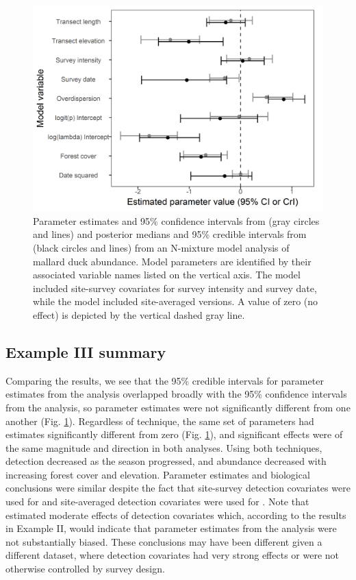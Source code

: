 \documentclass[codesnippet]{jss}
\begin{document}
\begin{figure}[p]
  \includegraphics[width=5in]{jss3107fig3.png}
  \caption{Parameter estimates and 95\% confidence intervals from  (gray circles and lines) and posterior medians and 95\% credible intervals from  (black circles and lines) from an N-mixture model analysis of mallard duck abundance. Model parameters are identified by their associated variable names listed on the vertical axis.  The  model included site-survey covariates for survey intensity and survey date, while the  model included site-averaged versions. A value of zero (no effect) is depicted by the vertical dashed gray line.}
  \label{fig:fig3}
\end{figure}

\subsection[Example III summary]{Example III summary}
Comparing the results, we see that the 95\% credible intervals for parameter estimates from the  analysis overlapped broadly with the 95\% confidence intervals from the  analysis, so parameter estimates were not significantly different from one another (Fig. \ref{fig:fig3}). Regardless of technique, the same set of parameters had estimates significantly different from zero (Fig. \ref{fig:fig3}), and significant effects were of the same magnitude and direction in both analyses. Using both techniques, detection decreased as the season progressed, and abundance decreased with increasing forest cover and elevation. Parameter estimates and biological conclusions were similar despite the fact that site-survey detection covariates were used for  and site-averaged detection covariates were used for . Note that  estimated moderate effects of detection covariates which, according to the results in Example II, would indicate that parameter estimates from the  analysis were not substantially biased. These conclusions may have been different given a different dataset, where detection covariates had very strong effects or were not otherwise controlled by survey design.
\end{document}
